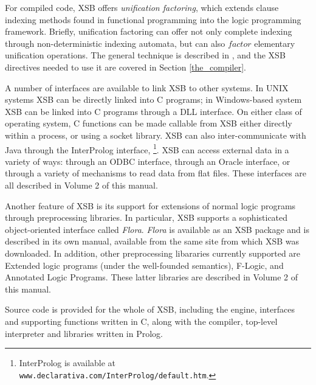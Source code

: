 For compiled code, XSB offers {\em unification factoring}, which
extends clause indexing methods found in functional programming into
the logic programming framework.  Briefly, unification factoring can
offer not only complete indexing through non-deterministic indexing
automata, but can also $factor$ elementary unification operations.
The general technique is described in \cite{DRSS96}, and the XSB
directives needed to use it are covered in Section
\ref{the_compiler}.

 A number of interfaces are available to link XSB
to other systems.  In UNIX systems XSB can be directly linked into C
programs; in Windows-based system XSB can be linked into C programs
through a DLL interface.  On either class of operating system, C
functions can be made callable from XSB either directly within a
process, or using a socket library.  XSB can also inter-communicate
with Java through the InterProlog interface, \footnote{InterProlog is
available at {\tt www.declarativa.com/InterProlog/default.htm}.}.  XSB
can access external data in a variety of ways: through an ODBC
interface, through an Oracle interface, or through a variety of
mechanisms to read data from flat files.  These interfaces are all
described in Volume 2 of this manual.


Another feature of XSB is its support for extensions of normal logic
programs through preprocessing libraries.  In particular, XSB supports
a sophisticated object-oriented interface called {\em Flora}.  {\em
Flora} is available as an XSB package and is described in its own
manual, available from the same site from which XSB was downloaded.
In addition, other preprocessing libararies currently supported are
Extended logic programs (under the well-founded semantics), F-Logic,
and Annotated Logic Programs.  These latter libraries are described in
Volume 2 of this manual.

Source code is provided for the whole of XSB, including the
engine, interfaces and supporting functions written in C, along with
the compiler, top-level interpreter and libraries written in Prolog.

